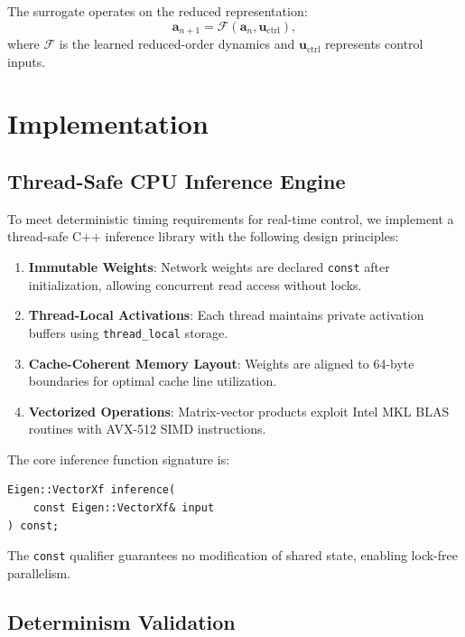 \documentclass[12pt]{article}
\begin{document}
The surrogate operates on the reduced representation:
\begin{equation}
\mathbf{a}_{n+1} = \mathcal{F}(\mathbf{a}_n, \mathbf{u}_{\text{ctrl}}),
\end{equation}
where $\mathcal{F}$ is the learned reduced-order dynamics and $\mathbf{u}_{\text{ctrl}}$ represents control inputs.

\section{Implementation}
\label{sec:implementation}

\subsection{Thread-Safe CPU Inference Engine}

To meet deterministic timing requirements for real-time control, we implement a thread-safe C++ inference library with the following design principles:

\begin{enumerate}
\item \textbf{Immutable Weights}: Network weights are declared \texttt{const} after initialization, allowing concurrent read access without locks.

\item \textbf{Thread-Local Activations}: Each thread maintains private activation buffers using \texttt{thread\_local} storage.

\item \textbf{Cache-Coherent Memory Layout}: Weights are aligned to 64-byte boundaries for optimal cache line utilization.

\item \textbf{Vectorized Operations}: Matrix-vector products exploit Intel MKL BLAS routines with AVX-512 SIMD instructions.
\end{enumerate}

The core inference function signature is:
\begin{verbatim}
Eigen::VectorXf inference(
    const Eigen::VectorXf& input
) const;
\end{verbatim}

The \texttt{const} qualifier guarantees no modification of shared state, enabling lock-free parallelism.

\subsection{Determinism Validation}
\end{document}
